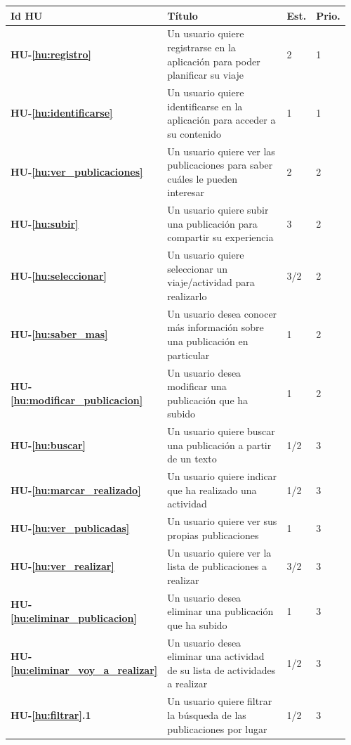 \documentclass[11pt]{article}
\begin{document}
\begin{longtable}{p{0.12\linewidth}p{0.7\linewidth}p{0.07\linewidth}p{0.07\linewidth}}
  \toprule
  \textbf{Id HU} & \textbf{Título} & \textbf{Est.} & \textbf{Prio.}\\
  \midrule
  \rowcolor{dollarbill}
  \textbf{HU-\ref{hu:registro}} & Un usuario quiere registrarse en la aplicación para poder planificar su viaje & 2 & 1\\
  \rowcolor{dollarbill}
  \textbf{HU-\ref{hu:identificarse}} & Un usuario quiere identificarse en la aplicación para  acceder a su contenido & 1 & 1\\
  \rowcolor{dollarbill}
  \textbf{HU-\ref{hu:ver_publicaciones}} & Un usuario quiere ver las publicaciones para saber cuáles le pueden interesar & 2 & 2\\
  \rowcolor{dollarbill}
  \textbf{HU-\ref{hu:subir}} & Un usuario quiere subir una publicación para compartir su experiencia & 3 & 2\\
  \rowcolor{dollarbill}
  \textbf{HU-\ref{hu:seleccionar}} & Un usuario quiere seleccionar un viaje/actividad para realizarlo & 3/2 & 2\\
  \textbf{HU-\ref{hu:saber_mas}} & Un usuario desea conocer más información sobre una publicación en particular & 1 & 2 \\ \textbf{HU-\ref{hu:modificar_publicacion}} & Un usuario desea modificar una publicación que ha subido & 1 & 2 \\
  \textbf{HU-\ref{hu:buscar}} & Un usuario quiere buscar una publicación a partir de un texto & 1/2 & 3 \\
  \textbf{HU-\ref{hu:marcar_realizado}} & Un usuario quiere indicar que ha realizado una actividad & 1/2 & 3 \\
  \textbf{HU-\ref{hu:ver_publicadas}} & Un usuario quiere ver sus propias publicaciones & 1 & 3 \\
  \textbf{HU-\ref{hu:ver_realizar}} & Un usuario quiere ver la lista de publicaciones a realizar & 3/2 & 3\\
  \textbf{HU-\ref{hu:eliminar_publicacion}} & Un usuario desea eliminar una publicación que ha subido & 1 & 3 \\
  \textbf{HU-\ref{hu:eliminar_voy_a_realizar}} & Un usuario desea eliminar una actividad de su lista de actividades a realizar & 1/2 & 3 \\
  \rowcolor{dollarbill}
  \textbf{HU-\ref{hu:filtrar}.1} & Un usuario quiere filtrar la búsqueda de las publicaciones por lugar & 1/2 & 3\\ 

\end{longtable}
\end{document}
